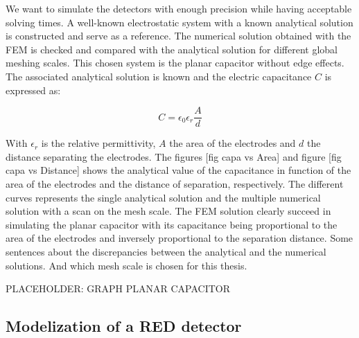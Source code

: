 We want to simulate the detectors with enough precision while having acceptable solving times. A well-known electrostatic system with a known analytical solution is constructed and serve as a reference. The numerical solution obtained with the FEM is checked and compared with the analytical solution for different global meshing scales. This chosen system is the planar capacitor without edge effects. The associated analytical solution is known and the electric capacitance $C$ is expressed as:

\begin{equation}
C = \epsilon_0 \epsilon_r \frac{A}{d}
\label{eq:planar-capacitor}
\end{equation}

With $\epsilon_r$ is the relative permittivity, $A$ the area of the electrodes and $d$ the distance separating the electrodes. The figures [fig capa vs Area] and figure [fig capa vs Distance] shows the analytical value of the capacitance in function of the area of the electrodes and the distance of separation, respectively. The different curves represents the single analytical solution and the multiple numerical solution with a scan on the mesh scale. The FEM solution clearly succeed in simulating the planar capacitor with its capacitance being proportional to the area of the electrodes and inversely proportional to the separation distance. 
Some sentences about the discrepancies between the analytical and the numerical solutions. And which mesh scale is chosen for this thesis.

{\color{red}PLACEHOLDER: GRAPH PLANAR CAPACITOR}


\subsection{Modelization of a RED detector}

